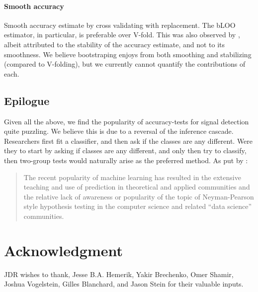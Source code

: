 \documentclass[]{bio}
\begin{document}
\paragraph{Smooth accuracy}
Smooth accuracy estimate by cross validating with replacement. 
The bLOO estimator, in particular, is preferable over V-fold.
This was also observed by \cite{yu2007two}, albeit attributed to the stability of the accuracy estimate, and not to its smoothness. 
We believe bootstraping enjoys from both smoothing and stabilizing (compared to V-folding), but we currently cannot quantify the contributions of each. 





\subsection{Epilogue}
Given all the above, we find the popularity of accuracy-tests for signal detection quite puzzling. 
We believe this is due to a reversal of the inference cascade. 
Researchers first fit a classifier, and then ask if the classes are any different.
Were they to start by asking if classes are any different, and only then try to classify, then two-group tests would naturally arise as the preferred method. 
As put by \cite{ramdas_classification_2016}:
\begin{quote}
	The recent popularity of machine learning has resulted in the extensive teaching and use
	of prediction in theoretical and applied communities and the relative lack of awareness or
	popularity of the topic of Neyman-Pearson style hypothesis testing in the computer science
	and related ``data science'' communities.
\end{quote}




\section*{Acknowledgment}
JDR wishes to thank, Jesse B.A. Hemerik, Yakir Brechenko, Omer Shamir, Joshua Vogelstein, Gilles Blanchard, and Jason Stein for their valuable inputs. 


\newpage


\end{document}
